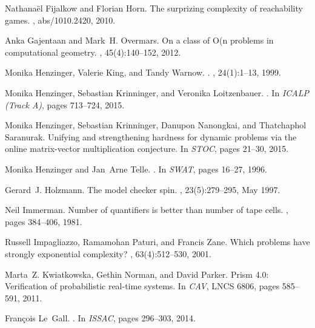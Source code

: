 \documentclass[11pt,letterpaper]{article}
\begin{document}
\begin{thebibliography}{10}
Nathana{\"{e}}l Fijalkow and Florian Horn.
\newblock The surprizing complexity of reachability games.
, abs/1010.2420, 2010.

Anka Gajentaan and Mark~H. Overmars.
\newblock On a class of {O}(n problems in computational
  geometry.
, 45(4):140--152, 2012.

Monika Henzinger, Valerie King, and Tandy Warnow.
.
, 24(1):1--13, 1999.

Monika Henzinger, Sebastian Krinninger, and Veronika Loitzenbauer.
.
\newblock In {\em {ICALP (Track A)}}, pages 713--724, 2015.

Monika Henzinger, Sebastian Krinninger, Danupon Nanongkai, and Thatchaphol
  Saranurak.
\newblock Unifying and strengthening hardness for dynamic problems via the
  online matrix-vector multiplication conjecture.
\newblock In {\em {STOC}}, pages 21--30, 2015.

Monika Henzinger and Jan~Arne Telle.
.
\newblock In {\em SWAT}, pages 16--27, 1996.

Gerard~J. Holzmann.
\newblock The model checker spin.
, 23(5):279--295, May 1997.

Neil Immerman.
\newblock Number of quantifiers is better than number of tape cells.
, pages 384--406, 1981.

Russell Impagliazzo, Ramamohan Paturi, and Francis Zane.
\newblock Which problems have strongly exponential complexity?
, 63(4):512--530, 2001.

Marta~Z. Kwiatkowska, Gethin Norman, and David Parker.
\newblock Prism 4.0: Verification of probabilistic real-time systems.
\newblock In {\em CAV}, LNCS 6806, pages 585--591, 2011.

Fran\c{c}ois Le~Gall.
.
\newblock In {\em ISSAC}, pages 296--303, 2014.


\end{thebibliography}
\end{document}
